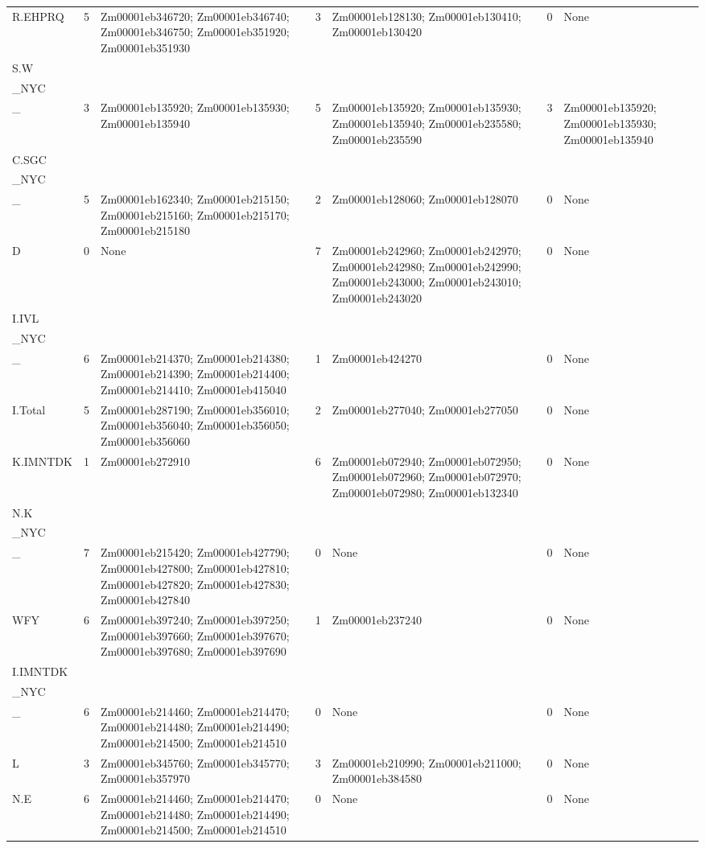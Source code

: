 \begin{longtable}{p{1.9cm}p{0.9cm}p{4.8cm}p{0.9cm}p{4.8cm}p{0.9cm}p{3.2cm}}
R.EHPRQ & 5 & Zm00001eb346720; Zm00001eb346740; Zm00001eb346750; Zm00001eb351920; Zm00001eb351930 & 3 & Zm00001eb128130; Zm00001eb130410; Zm00001eb130420 & 0 & None \\
S.W\\_NYC\\_ & 3 & Zm00001eb135920; Zm00001eb135930; Zm00001eb135940 & 5 & Zm00001eb135920; Zm00001eb135930; Zm00001eb135940; Zm00001eb235580; Zm00001eb235590 & 3 & Zm00001eb135920; Zm00001eb135930; Zm00001eb135940 \\
C.SGC\\_NYC\\_ & 5 & Zm00001eb162340; Zm00001eb215150; Zm00001eb215160; Zm00001eb215170; Zm00001eb215180 & 2 & Zm00001eb128060; Zm00001eb128070 & 0 & None \\
D & 0 & None & 7 & Zm00001eb242960; Zm00001eb242970; Zm00001eb242980; Zm00001eb242990; Zm00001eb243000; Zm00001eb243010; Zm00001eb243020 & 0 & None \\
I.IVL\\_NYC\\_ & 6 & Zm00001eb214370; Zm00001eb214380; Zm00001eb214390; Zm00001eb214400; Zm00001eb214410; Zm00001eb415040 & 1 & Zm00001eb424270 & 0 & None \\
I.Total & 5 & Zm00001eb287190; Zm00001eb356010; Zm00001eb356040; Zm00001eb356050; Zm00001eb356060 & 2 & Zm00001eb277040; Zm00001eb277050 & 0 & None \\
K.IMNTDK & 1 & Zm00001eb272910 & 6 & Zm00001eb072940; Zm00001eb072950; Zm00001eb072960; Zm00001eb072970; Zm00001eb072980; Zm00001eb132340 & 0 & None \\
N.K\\_NYC\\_ & 7 & Zm00001eb215420; Zm00001eb427790; Zm00001eb427800; Zm00001eb427810; Zm00001eb427820; Zm00001eb427830; Zm00001eb427840 & 0 & None & 0 & None \\
WFY & 6 & Zm00001eb397240; Zm00001eb397250; Zm00001eb397660; Zm00001eb397670; Zm00001eb397680; Zm00001eb397690 & 1 & Zm00001eb237240 & 0 & None \\
I.IMNTDK\\_NYC\\_ & 6 & Zm00001eb214460; Zm00001eb214470; Zm00001eb214480; Zm00001eb214490; Zm00001eb214500; Zm00001eb214510 & 0 & None & 0 & None \\
L & 3 & Zm00001eb345760; Zm00001eb345770; Zm00001eb357970 & 3 & Zm00001eb210990; Zm00001eb211000; Zm00001eb384580 & 0 & None \\
N.E & 6 & Zm00001eb214460; Zm00001eb214470; Zm00001eb214480; Zm00001eb214490; Zm00001eb214500; Zm00001eb214510 & 0 & None & 0 & None \\

\end{longtable}
